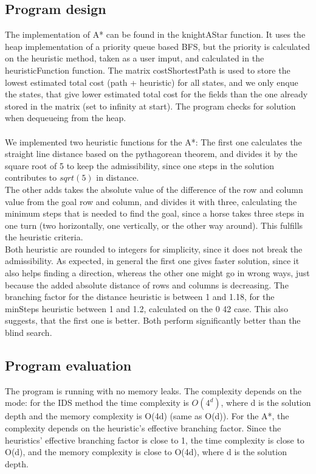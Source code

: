 \documentclass{article}
\begin{document}
\subsection*{Program design}
The implementation of A* can be found in the knightAStar function. It uses the heap implementation of a priority queue based BFS, but the priority is calculated on the heuristic method, taken as a user imput, and calculated in the heuristicFunction function. The matrix costShortestPath is used to store the lowest estimated total cost (path + heuristic) for all states, and we only enque the states, that give lower estimated total cost for the fields than the one already stored in the matrix (set to infinity at start). The program checks for solution when dequeueing from the heap.
\\
\\
We implemented two heuristic functions for the A*: The first one calculates the straight line distance based on the pythagorean theorem, and divides it by the square root of 5 to keep the admissibility, since one steps in the solution contributes to $sqrt(5)$ in distance.
\\
The other adds takes the absolute value of the difference of the row and column value from the goal row and column, and divides it with three, calculating the minimum steps that is needed to find the goal, since a horse takes three steps in one turn (two horizontally, one vertically, or the other way around). This fulfills the heuristic criteria.
\\
Both heuristic are rounded to integers for simplicity, since it does not break the admissibility. As expected, in general the first one gives faster solution, since it also helps finding a direction, whereas the other one might go in wrong ways, just because the added absolute distance of rows and columns is decreasing. The branching factor for the distance heuristic is between 1 and 1.18, for the minSteps heuristic between 1 and 1.2, calculated on the 0 42 case. This also suggests, that the first one is better. Both perform significantly better than the blind search.

\subsection*{Program evaluation}

The program is running with no memory leaks. The complexity depends on the mode: for the IDS method the time complexity is $O(4^d)$, where d is the solution depth and the memory complexity is O(4d) (same as O(d)). For the A*, the complexity depends on the heuristic's effective branching factor. Since the heuristics' effective branching factor is close to 1, the time complexity is close to O(d), and the memory complexity is close to O(4d), where d is the solution depth.
\end{document}
